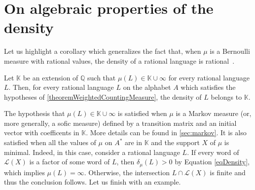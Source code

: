 \documentclass[a4paper,UKenglish,numberwithinsect,cleveref]{lipics-v2021}
\newcommand{\Q}{\mathbb{Q}}
\newcommand{\K}{\mathbb{K}}
\newcommand{\cL}{\mathcal L}
\begin{document}
\section{On algebraic properties  of the density} 
\label{sec:algebraic}
Let us highlight a corollary which generalizes the fact that, when $\mu$ is a Bernoulli measure with rational values, the density of a rational language is rational~\cite{Berstel1972}. 
\begin{corollary}\label{corollaryExtensionField}
    Let $\K$ be an extension of $\Q$ such that $\mu(L)\in \K\cup\infty$ for
    every rational language $L$. Then, for every rational language $L$ on the alphabet $A$
    which satisfies the hypotheses of \cref{theoremWeightedCountingMeasure}, the
    density of $L$ belongs to $\K$.
\end{corollary}

The hypothesis that $\mu(L)\in \K\cup\infty$ is satisfied when $\mu$ is a Markov measure (or, more generally, a sofic measure) defined by a transition matrix and an initial vector with coefficents in $\K$. 
More details can be found in \cref{sec:markov}. 
It is also satisfied when all the values of $\mu$ on $A^*$ are in $\K$ and the support $X$
of $\mu$ is minimal. Indeed, in this case, consider a rational language $L$. If every word
of $\cL(X)$ is a factor of some word of $L$, then $\delta_\mu(L)>0$ by Equation \eqref{eqDensity},
which implies $\mu(L)=\infty$. Otherwise, the intersection $L\cap \cL(X)$ is
finite and thus the conclusion follows. Let us finish with an example.
\end{document}
